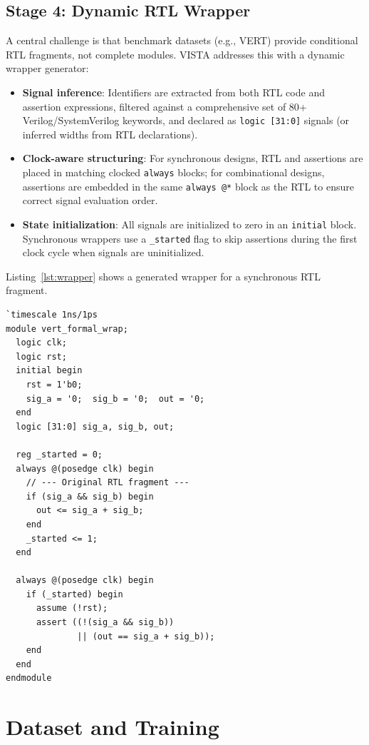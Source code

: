 \documentclass[conference]{IEEEtran}
\begin{document}
\subsection{Stage 4: Dynamic RTL Wrapper}
\label{sec:wrapper}
A central challenge is that benchmark datasets (e.g., VERT) provide conditional RTL fragments, not complete modules. VISTA addresses this with a dynamic wrapper generator:
\begin{itemize}
    \item \textbf{Signal inference}: Identifiers are extracted from both RTL code and assertion expressions, filtered against a comprehensive set of 80+ Verilog/SystemVerilog keywords, and declared as \texttt{logic [31:0]} signals (or inferred widths from RTL declarations).
    \item \textbf{Clock-aware structuring}: For synchronous designs, RTL and assertions are placed in matching clocked \texttt{always} blocks; for combinational designs, assertions are embedded in the same \texttt{always @*} block as the RTL to ensure correct signal evaluation order.
    \item \textbf{State initialization}: All signals are initialized to zero in an \texttt{initial} block. Synchronous wrappers use a \texttt{\_started} flag to skip assertions during the first clock cycle when signals are uninitialized.
\end{itemize}

Listing~\ref{lst:wrapper} shows a generated wrapper for a synchronous RTL fragment.

\begin{lstlisting}[caption={Generated wrapper for synchronous RTL with clocked assertion block.},label={lst:wrapper},float=t]
`timescale 1ns/1ps
module vert_formal_wrap;
  logic clk;
  logic rst;
  initial begin
    rst = 1'b0;
    sig_a = '0;  sig_b = '0;  out = '0;
  end
  logic [31:0] sig_a, sig_b, out;

  reg _started = 0;
  always @(posedge clk) begin
    // --- Original RTL fragment ---
    if (sig_a && sig_b) begin
      out <= sig_a + sig_b;
    end
    _started <= 1;
  end

  always @(posedge clk) begin
    if (_started) begin
      assume (!rst);
      assert ((!(sig_a && sig_b))
              || (out == sig_a + sig_b));
    end
  end
endmodule
\end{lstlisting}

\section{Dataset and Training}
\label{sec:training}
\end{document}
